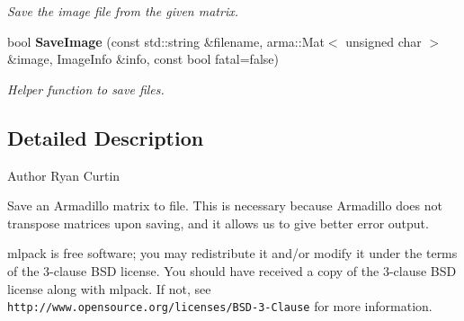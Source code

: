 \begin{DoxyCompactItemize}
\begin{DoxyCompactList}\small\item\em Save the image file from the given matrix. \end{DoxyCompactList}\item 
bool \textbf{ Save\+Image} (const std\+::string \&filename, arma\+::\+Mat$<$ unsigned char $>$ \&image, Image\+Info \&info, const bool fatal=false)
\begin{DoxyCompactList}\small\item\em Helper function to save files. \end{DoxyCompactList}\end{DoxyCompactItemize}


\subsection{Detailed Description}
\begin{DoxyAuthor}{Author}
Ryan Curtin
\end{DoxyAuthor}
Save an Armadillo matrix to file. This is necessary because Armadillo does not transpose matrices upon saving, and it allows us to give better error output.

mlpack is free software; you may redistribute it and/or modify it under the terms of the 3-\/clause B\+SD license. You should have received a copy of the 3-\/clause B\+SD license along with mlpack. If not, see {\tt http\+://www.\+opensource.\+org/licenses/\+B\+S\+D-\/3-\/\+Clause} for more information. 